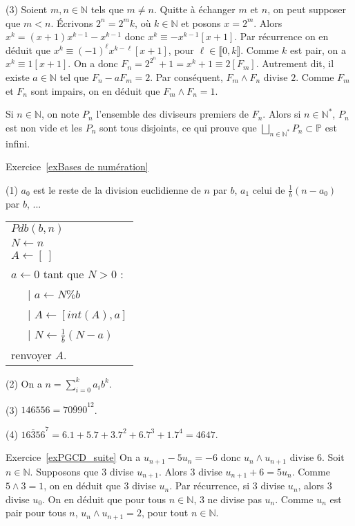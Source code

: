 \documentclass[11pt,a4paper]{article}
\newcommand{\N}{\mathbb{N}}
\begin{document}
(3) Soient $m,n\in \N$ tels que $m\neq n$. Quitte à échanger $m$ et $n$, on peut supposer que $m<n$. Écrivons $2^n=2^m k$, où $k\in \N$ et posons $x=2^m$. Alors $x^k=(x+1)x^{k-1}-x^{k-1}$ donc $x^k\equiv -x^{k-1}[x+1]$.  Par récurrence on en déduit que $x^k\equiv (-1)^\ell x^{k-\ell} [x+1]$, pour $\ell\in \llbracket 0,k\rrbracket$. 
Comme $k$ est pair, on a $x^k\equiv 1 [x+1]$. On a donc $F_{n}=2^{2^n}+1=x^k+1\equiv 2[F_m]$. Autrement dit, il existe $a\in \N$  tel que $F_n -a F_m =2$. Par conséquent, $F_m\wedge F_n $ divise $2$. Comme $F_m$ et $F_n$ sont impairs, on en déduit que $F_m\wedge F_n =1$. 

Si $n\in \N$, on note $P_n$ l'ensemble des diviseurs premiers de $F_n$. Alors si $n\in \N^*$, $P_n$ est non vide et les $P_n$ sont tous disjoints, ce qui prouve que $\bigsqcup_{n\in \N^*}  P_n\subset \mathbb{P}$ est infini.


Exercice~\ref{exBases de numération}


(1) $a_0$ est le reste de la division euclidienne de $n$ par $b$, $a_1$ celui de $\frac{1}{b}(n-a_0)$ par $b$, ...

\begin{center}
\begin{tabular}{l}
$Pdb(b,n)$\\
$N\leftarrow n$ \\
$A\leftarrow [\ ]$\\
$a\leftarrow 0$
tant que $N>0$ : \\
\ \ \ {\rm |} $a\leftarrow N \%b$\\
\ \ \ {\rm |} $A\leftarrow [int(A),a]$\\
\ \ \ {\rm |}  $N\leftarrow \frac{1}{b} (N-a)$ \\
renvoyer $A$.



\end{tabular}
\end{center}

(2) On a $n=\sum_{i=0}^k a_i b^k$. 

(3) $146556=\overline{70990}^{12}$.

(4) $\overline{16356}^7=6.1+5.7+3.7^2+6.7^3+1.7^4=4647$.


Exercice~\ref{exPGCD_suite} On a $u_{n+1}-5u_n=-6$ donc $u_n\wedge u_{n+1}$ divise $6$. Soit $n\in \N$. Supposons que $3$ divise $u_{n+1}$. Alors $3$ divise $u_{n+1}+6=5 u_n$. Comme $5\wedge 3=1$, on en déduit que $3$ divise $u_n$. Par récurrence, si $3$ divise $u_n$, alors $3$ divise $u_0$. On en déduit que pour tous $n\in \N$, $3$ ne divise pas $u_n$. Comme $u_n$ est pair pour tous $n$, $u_n\wedge u_{n+1}=2$, pour tout $n\in \N$.
\end{document}
